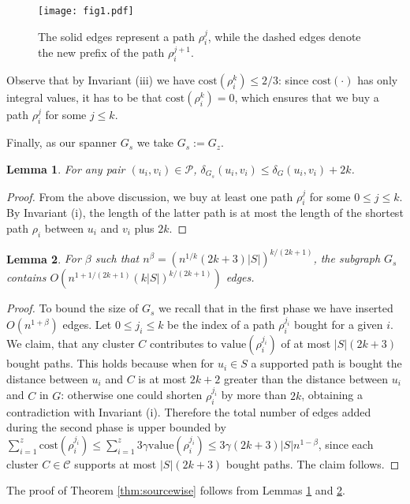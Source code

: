 \documentclass[a4paper,11pt]{article}
\newtheorem{lemma}{Lemma}[section]
\theoremstyle{definition}
\newcommand{\dist}{\delta}
\newcommand{\cost}{\mathrm{cost}}
\newcommand{\val}{\mathrm{value}}
\newcommand{\cP}{\mathcal{P}}
\newcommand{\cC}{\mathcal{C}}
\begin{document}
\begin{figure}[t]
\begin{center}
\texttt{[image: fig1.pdf]}
\end{center}
\caption{The solid edges represent a path $\rho_i^j$, while the dashed edges
  denote the new prefix of the path $\rho_i^{j+1}$.}
\label{fig1}
\end{figure}

Observe that by Invariant (iii) we have $\cost(\rho_i^k) \le 2/3$: since 
$\cost(\cdot)$ has only integral values, it has to be that $\cost(\rho_i^k) = 0$,
which ensures that we buy a path $\rho_i^j$ for some $j \le k$.

Finally, as our spanner $G_s$ we take $G_s := G_z$.






\begin{lemma}\label{lem:stretchSourcewise}
For any pair $(u_i,v_i) \in \cP$,  $\dist_{G_s}(u_i,v_i) \le \dist_G(u_i,v_i)+2k$.
\end{lemma}
\begin{proof}
From the above discussion, we buy at least one path $\rho^j_i$ for some $0\leq j\leq k$. By Invariant (i), the length of the latter path is  at most the length of the shortest path $\rho_i$ between $u_i$ and $v_i$ plus $2k$.
\end{proof}


\begin{lemma}
\label{lem:sizeSourcewise}
For $\beta$ such that $n^\beta=(n^{1/k}(2k+3)|S|)^{k/(2k+1)}$, the subgraph $G_s$ contains \linebreak $O(n^{1+1/(2k+1)}(k|S|)^{k/(2k+1)})$ edges. 
\end{lemma}
\begin{proof}
To bound the size of $G_s$
we recall that in the first phase we have inserted $O(n^{1+\beta})$ edges.
Let $0 \le j_i \le k$ be the index of a path $\rho_i^{j_i}$ bought for a given $i$.
We claim, that any cluster $C$ contributes to $\val(\rho_i^{j_i})$ of at most
$|S|(2k+3)$ bought paths.
This holds because when for $u_i \in S$ a supported path is bought 
the distance between $u_i$ and $C$ is at most $2k+2$ greater than 
the distance between $u_i$ and $C$ in $G$: otherwise one could shorten $\rho_i^{j_i}$
by more than $2k$, obtaining a contradiction with Invariant (i).
Therefore the total number of edges added during the second phase is upper bounded by
$\sum_{i=1}^z \cost(\rho_i^{j_i}) \le \sum_{i=1}^z 3\gamma\val(\rho_i^{j_i}) \le 3\gamma(2k+3)|S|n^{1-\beta}$,
since each cluster $C \in \cC$ supports at most $|S|(2k+3)$ bought paths. The claim follows.
\end{proof}
The proof of Theorem \ref{thm:sourcewise} follows from Lemmas \ref{lem:stretchSourcewise} and \ref{lem:sizeSourcewise}. 
\end{document}
